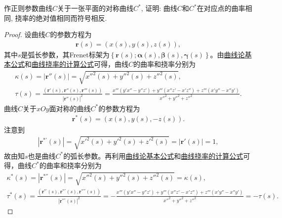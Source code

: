 \documentclass[../../main.tex]{subfiles}%
\begin{document}
\begin{example}
作正则参数曲线$C$关于一张平面的对称曲线$C^*$, 证明: 曲线$C$和$C^*$在对应点的曲率相同, 挠率的绝对值相同而符号相反.
\end{example}
\begin{proof}
设曲线$C$的参数方程为
\begin{align*}
\bm{r}(s) = \left( x(s), y(s), z(s) \right),
\end{align*}
其中$s$是弧长参数，其Frenet标架为$\left\{ \bm{r}(s); \bm{\alpha}(s), \bm{\beta}(s), \bm{\gamma}(s) \right\}$。由\hyperref[theorem:曲线论基本公式]{曲线论基本公式}和\hyperref[theorem:微分几何-曲线挠率的计算公式]{曲线挠率的计算公式}可得，曲线$C$的曲率和挠率分别为
\begin{gather*}
\kappa(s) = \left| \bm{r}''(s) \right| = \sqrt{x''^2(s) + y''^2(s) + z''^2(s)}, \\
\tau(s) = \frac{\left( \bm{r}'(s), \bm{r}''(s), \bm{r}'''(s) \right)}{\left| \bm{r}''(s) \right|^2} = \frac{x''' \left( y'x'' - y''z' \right) + y''' \left( x''z' - x'z'' \right) + z''' \left( x'y'' - x''y' \right)}{x''^2 + y''^2 + z''^2}.
\end{gather*}
曲线$C$关于$xOy$面对称的曲线$C^*$的参数方程为
\begin{align*}
\bm{r}^*(s) = \left( x(s), y(s), -z(s) \right).
\end{align*}
注意到
\begin{align*}
\left| \bm{r}^{*'}(s) \right| = \sqrt{x'^2(s) + y'^2(s) + z'^2(s)} = \left| \bm{r}'(s) \right| = 1,
\end{align*}
故由知$s$也是曲线$C^*$的弧长参数。再利用\hyperref[theorem:曲线论基本公式]{曲线论基本公式}和\hyperref[theorem:微分几何-曲线挠率的计算公式]{曲线挠率的计算公式}可得，曲线$C^*$的曲率和挠率分别为
\begin{gather*}
\kappa^*(s) = \left| \bm{r}^{*''}(s) \right| = \sqrt{x''^2(s) + y''^2(s) + z''^2(s)} = \kappa(s), \\
\tau^*(s) = \frac{\left( \bm{r}^{*'}(s), \bm{r}^{*''}(s), \bm{r}^{*'''}(s) \right)}{\left| \bm{r}^{*''}(s) \right|^2} = -\frac{x''' \left( y'x'' - y''z' \right) + y''' \left( x''z' - x'z'' \right) + z''' \left( x'y'' - x''y' \right)}{x''^2 + y''^2 + z''^2} = -\tau(s).
\end{gather*}
\end{proof}
\end{document}
